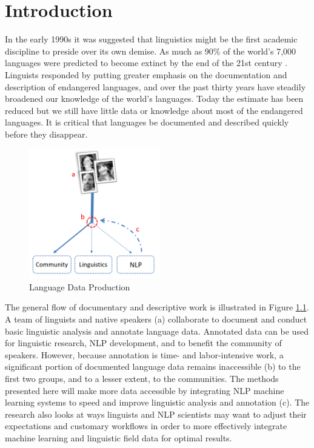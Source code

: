 \chapter{Introduction}
\label{chap:intro}

In the early 1990s it was suggested that linguistics might be the first academic discipline to preside over its own demise. As much as 90\% of the world’s 7,000 languages were predicted to become extinct by the end of the 21st century \citep{krauss_worlds_1992,krauss_keynote--mass_2007,campbell_new_2013}. 
Linguists responded by putting greater emphasis on the documentation and description of endangered languages, and over the past thirty years have steadily broadened our knowledge of the world's languages. Today the estimate has been reduced \cite{eberhard_ethnologue:2020} but we still have little data or knowledge about most of the endangered languages. It is critical that languages be documented and described quickly before they disappear. %

\begin{figure}[tb]
\centering
\includegraphics[width=5.75cm]{figs/Flowchart.PNG}
\caption[Language Data Production]{Language Data Production}
\label{fig:flowchart}
\end{figure}

The general flow of documentary and descriptive work is illustrated in Figure \ref{fig:flowchart}. A team of linguists and native speakers (a) collaborate to document and conduct basic linguistic analysis and annotate language data. Annotated data can be used for linguistic research, NLP development, and to benefit the community of speakers. However, because annotation is time- and labor-intensive work, a significant portion of documented language data remains inaccessible (b) to the first two groups, and to a lesser extent, to the communities. The methods presented here will make more data accessible by integrating NLP machine learning systems to speed and improve linguistic analysis and annotation (c). The research also looks at ways linguists and NLP scientists may want to adjust their expectations and customary workflows in order to more effectively integrate machine learning and linguistic field data for optimal results. 

